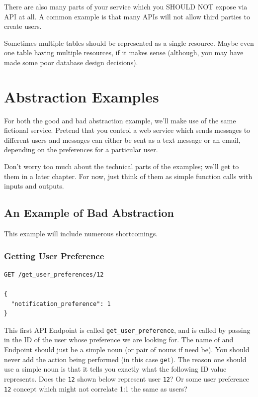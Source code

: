 \documentclass{book}
\begin{document}
There are also many parts of your service which you SHOULD NOT expose via API at all. A common example is that many APIs will not allow third parties to create users.

Sometimes multiple tables should be represented as a single resource. Maybe even one table having multiple resources, if it makes sense (although, you may have made some poor database design decisions).

\section {Abstraction Examples}

For both the good and bad abstraction example, we'll make use of the same fictional service. Pretend that you control a web service which sends messages to different users and messages can either be sent as a text message or an email, depending on the preferences for a particular user.

Don't worry too much about the technical parts of the examples; we'll get to them in a later chapter. For now, just think of them as simple function calls with inputs and outputs.

\subsection{An Example of Bad Abstraction}

This example will include numerous shortcomings.

\subsubsection{Getting User Preference}

\begin{verbatim}
GET /get_user_preferences/12

{
  "notification_preference": 1
}
\end{verbatim}

This first API Endpoint is called \texttt{get\_user\_preference}, and is called by passing in the ID of the user whose preference we are looking for. The name of and Endpoint should just be a simple noun (or pair of nouns if need be). You should never add the action being performed (in this case \texttt{get}). The reason one should use a simple noun is that it tells you exactly what the following ID value represents. Does the \texttt{12} shown below represent user \texttt{12}? Or some user preference \texttt{12} concept which might not correlate 1:1 the same as users?
\end{document}
